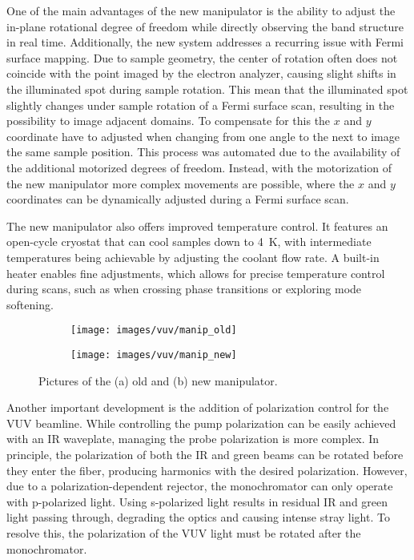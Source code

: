 One of the main advantages of the new manipulator is the ability to adjust the in-plane rotational degree of freedom while directly observing the band structure in real time.
Additionally, the new system addresses a recurring issue with Fermi surface mapping.
Due to sample geometry, the center of rotation often does not coincide with the point imaged by the electron analyzer, causing slight shifts in the illuminated spot during sample rotation.
This mean that the illuminated spot slightly changes under sample rotation of a Fermi surface scan, resulting in the possibility to image adjacent domains.
To compensate for this the $x$ and $y$ coordinate have to adjusted when changing from one angle to the next to image the same sample position.
This process was automated due to the availability of the additional motorized degrees of freedom.
Instead, with the motorization of the new manipulator more complex movements are possible, where the $x$ and $y$ coordinates can be dynamically adjusted during a Fermi surface scan.

The new manipulator also offers improved temperature control.
It features an open-cycle cryostat that can cool samples down to \qty{4}{\kelvin}, with intermediate temperatures being achievable by adjusting the coolant flow rate.
A built-in heater enables fine adjustments, which allows for precise temperature control during scans, such as when crossing phase transitions or exploring mode softening.

\begin{figure}[h]
	\centering
	\begin{subfigure}[b]{0.46\textwidth}
		\texttt{[image: images/vuv/manip\_old]}
		\caption{}
	\end{subfigure}
	\begin{subfigure}[b]{0.46\textwidth}
		\texttt{[image: images/vuv/manip\_new]}
		\caption{}
	\end{subfigure}
	\caption{Pictures of the (a) old and (b) new manipulator.}
	\label{fig:manip_full}
\end{figure}

Another important development is the addition of polarization control for the VUV beamline.
While controlling the pump polarization can be easily achieved with an IR waveplate, managing the probe polarization is more complex.
In principle, the polarization of both the IR and green beams can be rotated before they enter the fiber, producing harmonics with the desired polarization.
However, due to a polarization-dependent rejector, the monochromator can only operate with p-polarized light.
Using s-polarized light results in residual IR and green light passing through, degrading the optics and causing intense stray light.
To resolve this, the polarization of the VUV light must be rotated after the monochromator.

